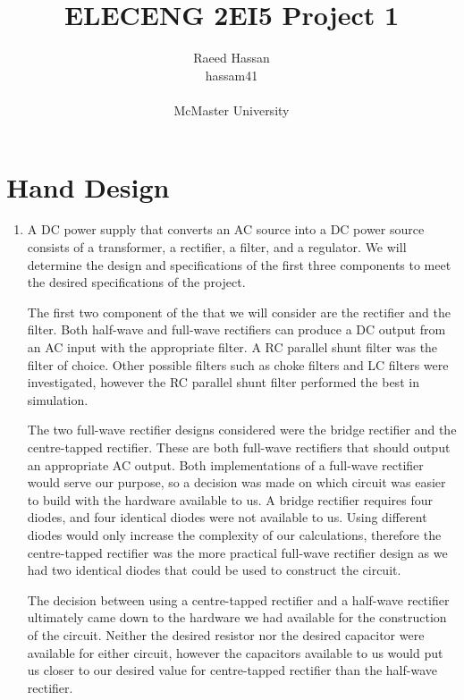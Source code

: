 \documentclass[12pt]{article}
\title{ELECENG 2EI5 Project 1}
\author{Raeed Hassan \\ hassam41 \\  \\ McMaster University}
\begin{document}
\maketitle
\pagebreak
\section{Hand Design}
\begin{enumerate}[label=\alph*.]
    \item %
    A DC power supply that converts an AC source into a DC power source consists of a transformer, a rectifier, a filter, and a regulator. We will determine the design and specifications of the first three components to meet the desired specifications of the project.
    
    The first two component of the that we will consider are the rectifier and the filter. Both half-wave and full-wave rectifiers can produce a DC output from an AC input with the appropriate filter. A RC parallel shunt filter was the filter of choice. Other possible filters such as choke filters and LC filters were investigated, however the RC parallel shunt filter performed the best in simulation.

    The two full-wave rectifier designs considered were the bridge rectifier and the centre-tapped rectifier. These are both full-wave rectifiers that should output an appropriate AC output. Both implementations of a full-wave rectifier would serve our purpose, so a decision was made on which circuit was easier to build with the hardware available to us. A bridge rectifier requires four diodes, and four identical diodes were not available to us. Using different diodes would only increase the complexity of our calculations, therefore the centre-tapped rectifier was the more practical full-wave rectifier design as we had two identical diodes that could be used to construct the circuit.

    The decision between using a centre-tapped rectifier and a half-wave rectifier ultimately came down to the hardware we had available for the construction of the circuit. Neither the desired resistor nor the desired capacitor were available for either circuit, however the capacitors available to us would put us closer to our desired value for centre-tapped rectifier than the half-wave rectifier.


\end{enumerate}
\end{document}
